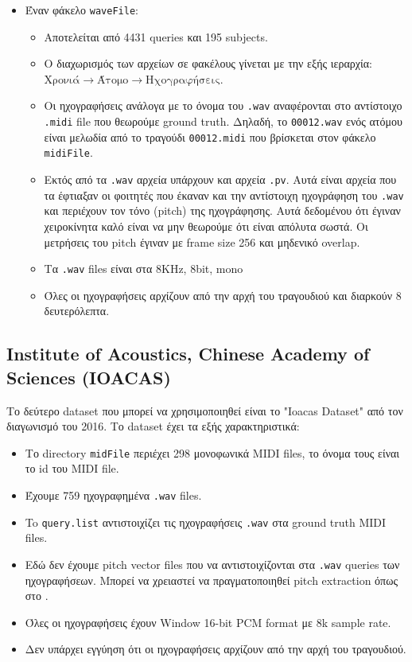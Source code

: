 \begin{itemize}
	\item Έναν φάκελο \texttt{waveFile}:
	      \begin{itemize}
	      	\item Αποτελείται από 4431 queries και 195 subjects.
	      	\item Ο διαχωρισμός των αρχείων σε φακέλους γίνεται με την εξής ιεραρχία:
	      	      \(\text{Χρονιά} \rightarrow \text{Άτομο} \rightarrow \text{Ηχογραφήσεις}\).
	      	\item Οι ηχογραφήσεις ανάλογα με το όνομα του \texttt{.wav} αναφέρονται στο αντίστοιχο \texttt{.midi} file που θεωρούμε ground truth.
	      	      Δηλαδή, το \texttt{00012.wav} ενός ατόμου είναι μελωδία από το τραγούδι \texttt{00012.midi} που βρίσκεται στον φάκελο \texttt{midiFile}.
	      	\item Εκτός από τα \texttt{.wav} αρχεία υπάρχουν και αρχεία \texttt{.pv}.\label{item:pitch-vector}
	      	      Αυτά είναι αρχεία που τα έφτιαξαν οι φοιτητές που έκαναν και την αντίστοιχη
	      	      ηχογράφηση του \texttt{.wav} και περιέχουν τον τόνο (pitch) της ηχογράφησης. Αυτά δεδομένου ότι
	      	      έγιναν χειροκίνητα καλό είναι να μην θεωρούμε ότι είναι απόλυτα σωστά. Οι μετρήσεις του
	      	      pitch έγιναν με frame size 256 και μηδενικό overlap.
	      	\item Τα \texttt{.wav} files είναι στα 8KHz, 8bit, mono
	      	\item Όλες οι ηχογραφήσεις αρχίζουν από την αρχή του τραγουδιού και διαρκούν 8 δευτερόλεπτα.
	      \end{itemize}
\end{itemize}

\subsection{Institute of Acoustics, Chinese Academy of Sciences (IOACAS)}
Το δεύτερο dataset που μπορεί να χρησιμοποιηθεί είναι το "Ioacas Dataset" \cite{IOACAS-dataset} από τον διαγωνισμό του 2016. Το dataset έχει τα εξής χαρακτηριστικά:
\begin{itemize}
	\item Το directory \texttt{midFile} περιέχει 298 μονοφωνικά MIDI files, το όνομα τους είναι το id του MIDI file.
	\item Έχουμε 759 ηχογραφημένα \texttt{.wav} files.
	\item To \texttt{query.list} αντιστοιχίζει τις ηχογραφήσεις \texttt{.wav} στα ground truth MIDI files.
	\item Εδώ δεν έχουμε pitch vector files που να αντιστοιχίζονται στα \texttt{.wav} queries των ηχογραφήσεων.
	      Μπορεί να χρειαστεί να πραγματοποιηθεί pitch extraction όπως στο \cite{park2015query}.
	\item Όλες οι ηχογραφήσεις έχουν Window 16-bit PCM format με 8k sample rate.
	\item Δεν υπάρχει εγγύηση ότι οι ηχογραφήσεις αρχίζουν από την αρχή του τραγουδιού.
\end{itemize}


